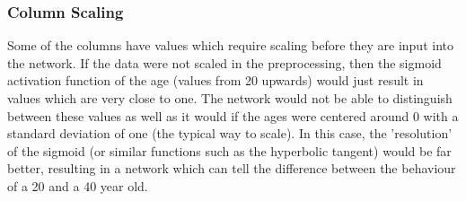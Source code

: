         \subsubsection{Column Scaling}
            Some of the columns have values which require scaling before they are input into the network. If the data were not scaled in the preprocessing, then the sigmoid activation function of the age (values from 20 upwards) would just result in values which are very close to one. The network would not be able to distinguish between these values as well as it would if the ages were centered around 0 with a standard deviation of one (the typical way to scale). In this case, the 'resolution' of the sigmoid (or similar functions such as the hyperbolic tangent) would be far better, resulting in a network which can tell the difference between the behaviour of a 20 and a 40 year old.
